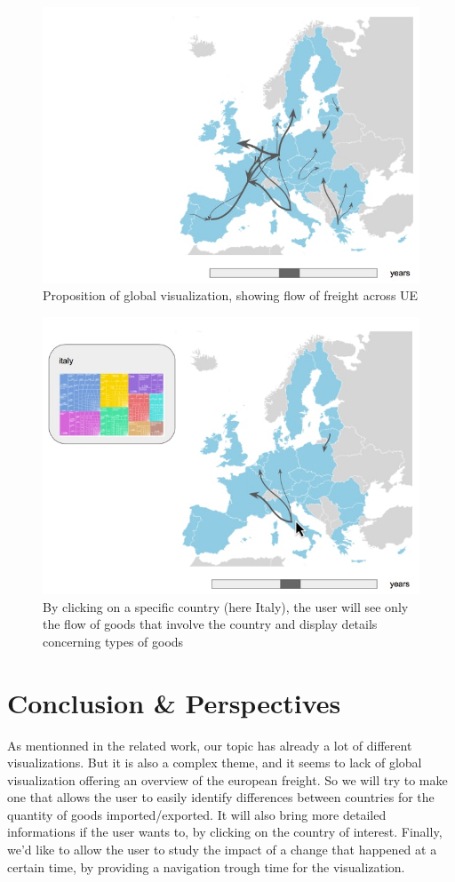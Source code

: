 \documentclass{vgtc}
\begin{document}
\begin{figure}[H]
\includegraphics[scale=0.35]{Capture_ecran_2017-11-29_171310.jpg}
\caption{Proposition of global visualization, showing flow of freight across UE}
\end{figure}

\begin{figure}[H]
\includegraphics[scale=0.35]{Capture_ecran_2017-11-29_171255.jpg}
\caption{By clicking on a specific country (here Italy), the user will see only the flow of goods that involve the country and display details concerning types of goods}
\end{figure}

\section{Conclusion \& Perspectives}
As mentionned in the related work, our topic has already a lot of different visualizations. But it is also a complex theme, and it seems to lack of global visualization offering an overview of the european freight. So we will try to make one that allows the user to easily identify differences between countries for the quantity of goods imported/exported. It will also bring more detailed informations if the user wants to, by clicking on the country of interest. Finally, we’d like to allow the user to study the impact of a change that happened at a certain time, by providing a navigation trough time for the visualization.


\end{document}
